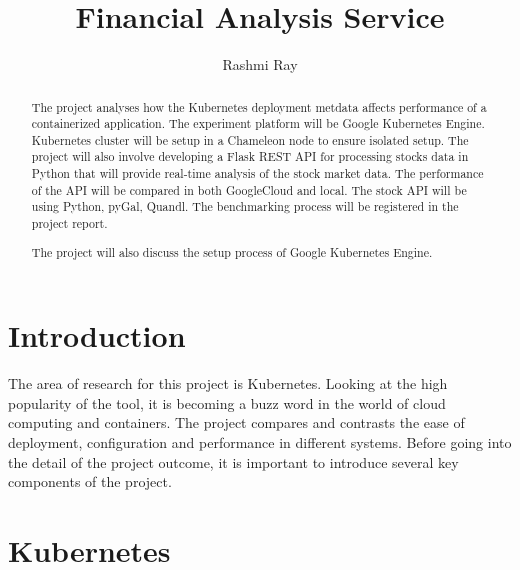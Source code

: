 
\title{Financial Analysis Service}

\author{Rashmi Ray}

\renewcommand{\shortauthors}{Rashmi Ray}

\begin{abstract}
  The project analyses how the Kubernetes deployment metdata affects
  performance of a containerized application. The experiment platform will be
  Google Kubernetes Engine. Kubernetes cluster will be setup in a Chameleon
  node to ensure isolated setup. The project will also involve developing a
  Flask REST API for processing stocks data in Python that will provide
  real-time analysis of the stock market data. The performance of the API will
  be compared in both GoogleCloud and local. The stock API will be using
  Python, pyGal, Quandl. The benchmarking process will be registered in the
  project report. 
  
  The project will also discuss the setup process of Google Kubernetes Engine.
   

\end{abstract}



\maketitle

\section{Introduction}

The area of research for this project is Kubernetes. Looking at the high
popularity of the tool, it is becoming a buzz word in the world of cloud
computing and containers. The project compares and contrasts the ease of
deployment, configuration and performance in different systems. Before going
into the detail of the project outcome, it is important to introduce several
key components of the project.

\section{Kubernetes}

